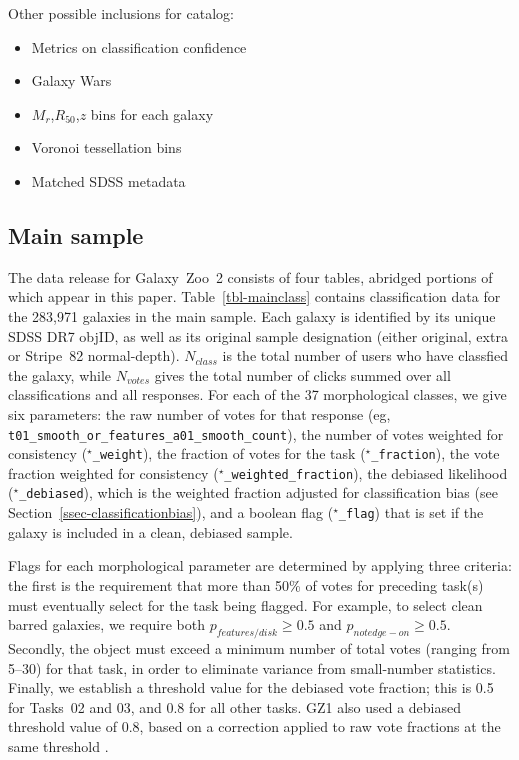 \documentclass[useAMS,usenatbib]{mn2e}
\newcommand{\mr}{$M_r$}
\newcommand{\rfifty}{$R_{50}$}
\begin{document}
Other possible inclusions for catalog:
\begin{itemize}
	\item Metrics on classification confidence \citep[Table 04,][]{lin11}
	\item Galaxy Wars
	\item \mr,\rfifty,$z$ bins for each galaxy
	\item Voronoi tessellation bins
	\item Matched SDSS metadata
\end{itemize}

\subsection{Main sample}\label{ssec-catalog_main}

The data release for Galaxy~Zoo~2 consists of four tables, abridged portions of which appear in this paper. Table~\ref{tbl-mainclass} contains classification data for the 283,971 galaxies in the main sample. Each galaxy is identified by its unique SDSS DR7 objID, as well as its original sample designation (either original, extra or Stripe~82 normal-depth). $N_{class}$ is the total number of users who have classfied the galaxy, while $N_{votes}$ gives the total number of clicks summed over all classifications and all responses. For each of the 37 morphological classes, we give six parameters: the raw number of votes for that response (eg, {\tt t01\_smooth\_or\_features\_a01\_smooth\_count}), the number of votes weighted for consistency ({\tt $^\star$\_weight}), the fraction of votes for the task ({\tt $^\star$\_fraction}), the vote fraction weighted for consistency ({\tt $^\star$\_weighted\_fraction}), the debiased likelihood ({\tt $^\star$\_debiased}), which is the weighted fraction adjusted for classification bias (see Section~\ref{ssec-classificationbias}), and a boolean flag ({\tt $^\star$\_flag}) that is set if the galaxy is included in a clean, debiased sample.

Flags for each morphological parameter are determined by applying three criteria: the first is the requirement that more than 50\% of votes for preceding task(s) must eventually select for the task being flagged. For example, to select clean barred galaxies, we require both $p_{features/disk}\geq0.5$ and $p_{not edge-on}\geq0.5$. Secondly, the object must exceed a minimum number of total votes (ranging from 5--30) for that task, in order to eliminate variance from small-number statistics. Finally, we establish a threshold value for the debiased vote fraction; this is 0.5 for Tasks~02 and 03, and 0.8 for all other tasks. GZ1 also used a debiased threshold value of 0.8, based on a correction applied to raw vote fractions at the same threshold \citep{bam09,lin11}. 
\end{document}
